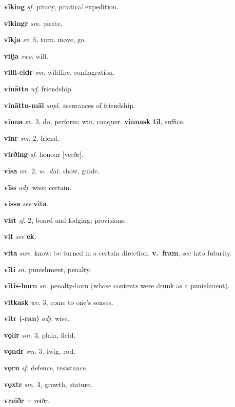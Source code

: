 \documentclass[12pt,letterpaper]{book}
\begin{document}
\noindent
\textbf{vīking} \textit{sf.} piracy, piratical expedition.

\noindent
\textbf{vīkingr} \textit{sm.} pirate.

\noindent
\textbf{vīkja} \textit{sv.} 6, turn, move, go.

\noindent
\textbf{vilja} \textit{swv.} will.

\noindent
\textbf{villi-eldr} \textit{sm.} wildfire, conflagration.

\noindent
\textbf{vinātta} \textit{wf.} friendship.

\noindent
\textbf{vināttu-māl} \textit{snpl.} assurances of friendship.

\noindent
\textbf{vinna} \textit{sv.} 3, do, perform; win, conquer.  \textbf{vinnask
	til}, suffice.

\noindent
\textbf{vinr} \textit{sm.} 2, friend.

\noindent
\textbf{virðing} \textit{sf.} honour [verðr].

\noindent
\textbf{vīsa} \textit{wv.} 2, \textit{w.\ dat.} show, guide.

\noindent
\textbf{vīss} \textit{adj.} wise; certain.

\noindent
\textbf{vissa} \textit{} \textit{see} \textbf{vita}.

\noindent
\textbf{vist} \textit{sf.} 2, board and lodging; provisions.

\noindent
\textbf{vit} \textit{} \textit{see} \textbf{ek}.

\noindent
\textbf{vita} \textit{swv.} know; be turned in a certain direction.
	\textbf{v.\ fram}, see into futurity.

\noindent
\textbf{vīti} \textit{sn.} punishment, penalty.

\noindent
\textbf{vītis-horn} \textit{sn.} penalty-horn (whose contents were drunk
	as a punishment).

\noindent
\textbf{vitkask} \textit{wv.} 3, come to one's senses.

\noindent
\textbf{vitr (-ran)} \textit{adj.} wise.

\noindent
\textbf{vǫllr} \textit{sm.} 3, plain, field.

\noindent
\textbf{vǫndr} \textit{sm.} 3, twig, rod.

\noindent
\textbf{vǫrn} \textit{sf.} defence, resistance.

\noindent
\textbf{vǫxtr} \textit{sm.} 3, growth, stature.

\noindent
\textbf{vreiðr} \textit{} = reiðr.
\end{document}
